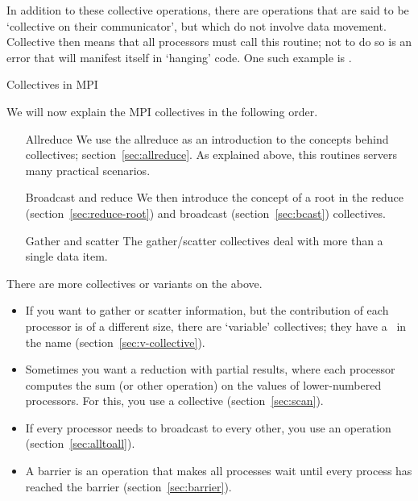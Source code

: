 In addition to these collective operations, there are operations that
are said to be `collective on their communicator', but which do not
involve data movement. Collective then means that all processors must
call this routine; not to do so is an error that will 
manifest itself in `hanging' code. One such example is
.

 {Collectives in MPI}

We will now explain the MPI collectives in the following order.
\begin{itemize}
\item[Allreduce] We use the allreduce as an introduction to the
  concepts behind collectives; section~\ref{sec:allreduce}. As
  explained above, this routines servers many practical scenarios.
\item[Broadcast and reduce] We then introduce the concept of a root
  in the reduce (section~\ref{sec:reduce-root}) and broadcast
  (section~\ref{sec:bcast}) collectives.
\item[Gather and scatter] The gather/scatter collectives deal with
  more than a single data item.
\end{itemize}

There are more collectives or variants on the above.
\begin{itemize}
\item If you want to gather or scatter information, but the contribution
  of each processor is of a different size, there are `variable' collectives;
  they have a~ in the name (section~\ref{sec:v-collective}).
\item Sometimes you want a reduction with partial results, where each processor
  computes the sum (or other operation) on the values of lower-numbered processors.
  For this, you use a  collective (section~\ref{sec:scan}).
\item If every processor needs to broadcast to every other, you use an
   operation (section~\ref{sec:alltoall}).
\item A barrier is an operation that makes all processes wait until every
  process has reached the barrier (section~\ref{sec:barrier}).
\end{itemize}

\begin{comment}
  Thus, MPI has the following operations:
  \begin{itemize}
  \item \indexmpishow{MPI_Allreduce} is equivalent to a
    \indexmpishow{MPI_Reduce} followed by a broadcast.
  \item \indexmpishow{MPI_Allgather} is equivalent to a
    \indexmpishow{MPI_Gather} followed by a broadcast.
  \item \indexmpishow{MPI_Allgatherv} is equivalent to an
    \indexmpishow{MPI_Gatherv} followed by a broadcast.
  \item \indexmpishow{MPI_Alltoall}, \indexmpishow{MPI_Alltoallv}.
  \end{itemize}
\end{comment}

